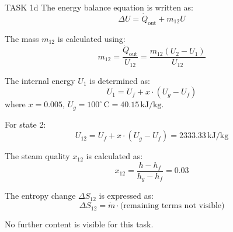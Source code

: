 TASK 1d  
The energy balance equation is written as:  
\[
\Delta U = \dot{Q}_{\text{out}} + m_{12} U
\]  

The mass \( m_{12} \) is calculated using:  
\[
m_{12} = \frac{\dot{Q}_{\text{out}}}{U_{12}} = \frac{m_{12} (U_2 - U_1)}{U_{12}}
\]  

The internal energy \( U_1 \) is determined as:  
\[
U_1 = U_f + x \cdot (U_g - U_f)
\]  
where \( x = 0.005 \), \( U_g = 100^\circ \, \text{C} = 40.15 \, \text{kJ/kg} \).  

For state 2:  
\[
U_{12} = U_f + x \cdot (U_g - U_f) = 2333.33 \, \text{kJ/kg}
\]  

The steam quality \( x_{12} \) is calculated as:  
\[
x_{12} = \frac{h - h_f}{h_g - h_f} = 0.03
\]  

The entropy change \( \Delta S_{12} \) is expressed as:  
\[
\Delta S_{12} = \dot{m} \cdot \text{(remaining terms not visible)}
\]  

No further content is visible for this task.